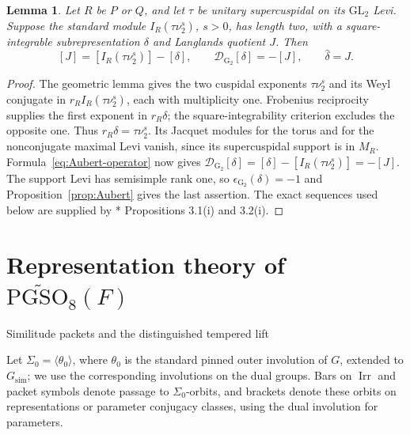 \documentclass[12pt]{amsart}
\makeatletter
\renewcommand{\subsection}{\@startsection{subsection}{2}%
  \z@{.7\linespacing\@plus.5\linespacing}{.35\linespacing}%
  {\normalfont\bfseries\raggedright}}
\theoremstyle{definition}
\theoremstyle{plain}
\newtheorem{lemma}[definition]{Lemma}
\theoremstyle{remark}
\def\GL{\mathrm{GL}}
\def\PGSO{\mathrm{PGSO}}
\DeclareMathOperator{\Irr}{Irr}%
\numberwithin{equation}{section}
\newcommand{\rG}{\mathrm{G}}
\makeatother
\begin{document}
\begin{lemma}\label{lem:rank-one}
Let $R$ be $P$ or $Q$, and let $\tau$ be unitary supercuspidal on its
$\GL_2$ Levi. Suppose the standard module $I_R(\tau\nu_2^s)$, $s>0$,
has length two, with a square-integrable subrepresentation $\delta$ and
Langlands quotient $J$. Then
\[
 [J]=[I_R(\tau\nu_2^s)]-[\delta],\qquad
 \mathcal D_{\rG_2}[\delta]=-[J],\qquad\widehat\delta=J.
\]
\end{lemma}
\begin{proof}
The geometric lemma gives the two cuspidal exponents $\tau\nu_2^s$
and its Weyl conjugate in $r_R I_R(\tau\nu_2^s)$, each with
multiplicity one. Frobenius reciprocity supplies the first exponent in
$r_R\delta$; the square-integrability criterion excludes the opposite
one. Thus $r_R\delta=\tau\nu_2^s$. Its Jacquet modules for the torus
and for the nonconjugate maximal Levi vanish, since its supercuspidal
support is in $M_R$. Formula~\eqref{eq:Aubert-operator} now gives
$\mathcal D_{\rG_2}[\delta]=[\delta]-[I_R(\tau\nu_2^s)]=-[J]$.
The support Levi has semisimple rank one, so
$\epsilon_{\rG_2}(\delta)=-1$ and Proposition~\ref{prop:Aubert} gives
the last assertion. The exact sequences used below are supplied by
\cite{GanSavin2023-HoweDualityDichotomyExceptionalThetaCorrespondences}*{
Propositions 3.1(i) and 3.2(i)}.
\end{proof}



\section{Representation theory of $\widetilde{\PGSO_8}(F)$}


\subsection{Similitude packets and the distinguished tempered lift}\label{subsec:similitude-preliminaries}

Let $\Sigma_0=\langle\theta_0\rangle$, where $\theta_0$ is the standard pinned outer involution of $G$, extended to $G_{\mathrm{sim}}$;
we use the corresponding involutions on the dual groups.
Bars on $\Irr$ and packet symbols denote passage to $\Sigma_0$-orbits,
and brackets denote these orbits on representations or parameter
conjugacy classes, using the dual involution for parameters.
\end{document}
